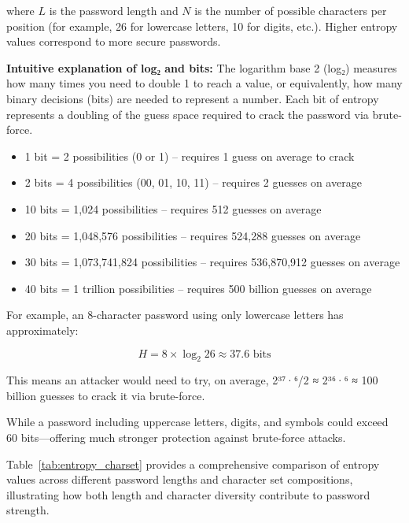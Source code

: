 where $L$ is the password length and $N$ is the number of possible characters per position (for example, 26 for lowercase letters, 10 for digits, etc.). Higher entropy values correspond to more secure passwords.

\textbf{Intuitive explanation of log₂ and bits:}
The logarithm base 2 (log₂) measures how many times you need to double 1 to reach a value, or equivalently, how many binary decisions (bits) are needed to represent a number. Each bit of entropy represents a doubling of the guess space required to crack the password via brute-force.
\begin{itemize}
    \item 1 bit = 2 possibilities (0 or 1) -- requires 1 guess on average to crack
    \item 2 bits = 4 possibilities (00, 01, 10, 11) -- requires 2 guesses on average
    \item 10 bits = 1,024 possibilities -- requires 512 guesses on average
    \item 20 bits = 1,048,576 possibilities -- requires 524,288 guesses on average
    \item 30 bits = 1,073,741,824 possibilities -- requires 536,870,912 guesses on average
    \item 40 bits = 1 trillion possibilities -- requires 500 billion guesses on average
\end{itemize}
For example, an 8-character password using only lowercase letters has approximately:

\begin{equation}
H = 8 \times \log_2 26 \approx 37.6 \text{ bits}
\end{equation}

This means an attacker would need to try, on average, 2³⁷·⁶/2 ≈ 2³⁶·⁶ ≈ 100 billion guesses to crack it via brute-force.

While a password including uppercase letters, digits, and symbols could exceed 60 bits---offering much stronger protection against brute-force attacks.

Table~\ref{tab:entropy_charset} provides a comprehensive comparison of entropy values across different password lengths and character set compositions, illustrating how both length and character diversity contribute to password strength.

